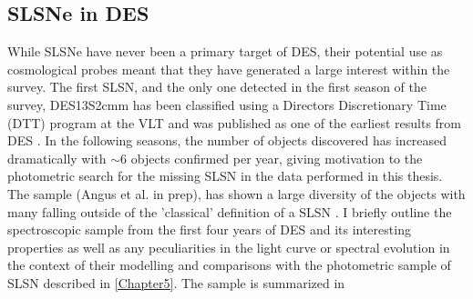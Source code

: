 \subsection{SLSNe in DES} \label{sec:DES_SLSN}
While SLSNe have never been a primary target of DES, their potential use as cosmological probes \citep{Inserra2014} meant that they have generated a large interest within the survey. The first SLSN, and the only one detected in the first season of the survey, DES13S2cmm has been classified using a Directors Discretionary Time (DTT) program at the VLT and was published as one of the earliest results from DES \citep{Papadopoulos2015}. In the following seasons, the number of objects discovered has increased dramatically with $\sim$6 objects confirmed per year, giving motivation to the photometric search for the missing SLSN in the data performed in this thesis. The sample (Angus et al. in prep), has shown a large diversity of the objects with many falling outside of the 'classical' definition of a SLSN \citep{Inserra2018}. I briefly outline the spectroscopic sample from the first four years of DES and its interesting properties as well as any peculiarities in the light curve or spectral evolution in the context of their modelling and comparisons with the photometric sample of SLSN described in \cref{Chapter5}. The sample is summarized in 

